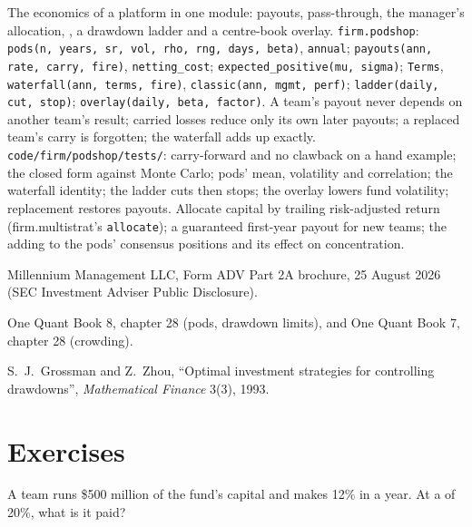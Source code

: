 \begin{build}
 The economics of a platform in one module: payouts, pass-through, the manager's allocation, , a drawdown ladder and a
centre-book overlay.
 \texttt{firm.podshop}: \texttt{pods(n, years, sr, vol, rho, rng, days, beta)}, \texttt{annual}; \texttt{payouts(ann, rate,
carry, fire)}, \texttt{netting\_cost}; \texttt{expected\_positive(mu, sigma)}; \texttt{Terms}, \texttt{waterfall(ann, terms, fire)},
\texttt{classic(ann, mgmt, perf)}; \texttt{ladder(daily, cut, stop)}; \texttt{overlay(daily, beta, factor)}.
 A team's payout never depends on another team's result; carried losses reduce only its own later payouts; a replaced team's carry is
forgotten; the waterfall adds up exactly.
 \texttt{code/firm/podshop/tests/}: carry-forward and no clawback on a hand example; the closed form against Monte
Carlo; pods' mean, volatility and correlation; the waterfall identity; the ladder cuts then stops; the overlay lowers fund volatility; replacement
restores payouts.
 Allocate capital by trailing risk-adjusted return (firm.multistrat's \texttt{allocate}); a guaranteed first-year payout for new
teams; the  adding to the pods' consensus positions and its effect on concentration.
\end{build}

\begin{omsources}
\item Millennium Management LLC, Form ADV Part 2A brochure, 25 August 2026 (SEC Investment Adviser Public Disclosure).
\item One Quant Book 8, chapter 28 (pods, drawdown limits), and One Quant Book 7, chapter 28 (crowding).
\item S.~J.~Grossman and Z.~Zhou, ``Optimal investment strategies for controlling drawdowns'', \emph{Mathematical Finance} 3(3), 1993.
\end{omsources}

\section{Exercises}

\begin{exercise}[$\star$]\label{exo:fm:the-multi-manager-platform:1}
A team runs \$500 million of the fund's capital and makes 12\% in a year. At a  of 20\%, what is it paid?
\end{exercise}

